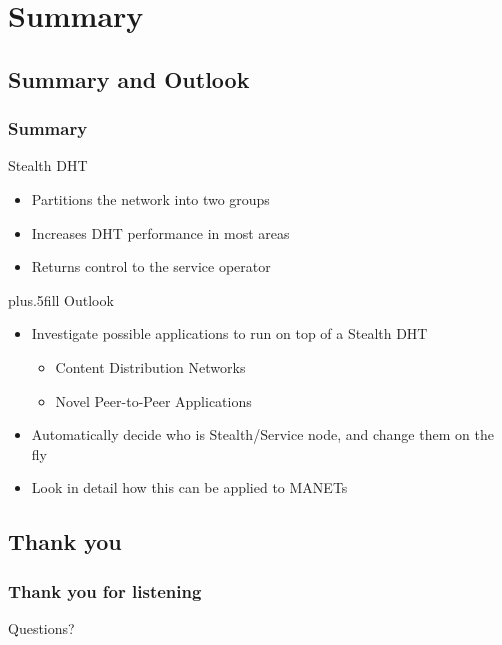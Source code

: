 \documentclass{beamer}
\begin{document}
\section{Summary}

\subsection[Summary and Outlook]{Summary and Outlook}

\begin{frame}
  \frametitle<presentation>{Summary}

  Stealth DHT
  \begin{itemize}
  \item
    \alert{Partitions the network} into two groups
  \item
    \alert{Increases DHT performance} in most areas
  \item
    \alert{Returns control} to the service operator
  \end{itemize}

  \vskip0pt plus.5fill
Outlook
  \begin{itemize}
    \item
      Investigate \alert{possible applications} to run on top of a Stealth DHT
      \begin{itemize}
        \item Content Distribution Networks
        \item Novel Peer-to-Peer Applications
      \end{itemize}

    \item
      Automatically decide who is Stealth/Service node, and
      change them on the fly

    \item
      Look in detail how this can be applied to MANETs
  \end{itemize}
\end{frame}

%
%
%

\subsection[Thank you]{Thank you}

\begin{frame}
  \frametitle{Thank you for listening}
  \begin{center}
    \alert{Questions?}
    \titlepage
  \end{center}
\end{frame}
\end{document}
